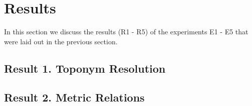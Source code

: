 \section{Results}
\label{section:results}

In this section we discuss the results (R1 - R5) of the experiments E1 - E5 that were laid out in the previous section.


\subsection{Result 1. Toponym Resolution}







\subsection{Result 2. Metric Relations}

